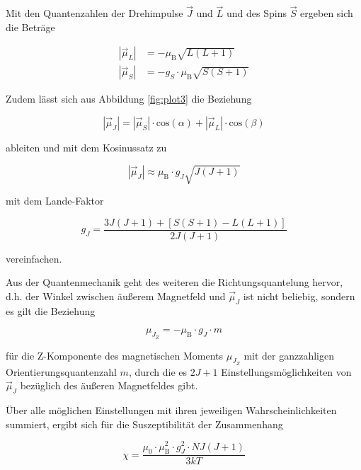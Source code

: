 Mit den Quantenzahlen der Drehimpulse $\vec{J}$ und $\vec{L}$ und des Spins $\vec{S}$
ergeben sich die Beträge

\begin{align}
    |\vec{\mu}_L| &= - \mu_\text{B} \sqrt{L\left(L+1\right)}\\
    |\vec{\mu}_S| &= - g_S \cdot \mu_\text{B} \sqrt{S\left(S+1\right)}
\end{align}

Zudem lässt sich aus Abbildung \ref{fig:plot3} die Beziehung

\begin{equation}
    |\vec{\mu}_J| = |\vec{\mu}_S| \cdot \text{cos}\left(\alpha \right) + 
    |\vec{\mu}_L| \cdot \text{cos}\left(\beta \right)
\end{equation}

ableiten und mit dem Kosinussatz zu 

\begin{equation}
    |\vec{\mu}_J| \approx \mu_\text{B} \cdot g_J \sqrt{J\left(J+1\right)}
\end{equation}

mit dem Lande-Faktor 

\begin{equation}
    g_J = \frac{3J(J+1) + [S(S+1) - L(L+1)]} {2 J(J+1)}
\end{equation}

vereinfachen.

Aus der Quantenmechanik geht des weiteren die Richtungsquantelung hervor, d.h.
der Winkel zwischen äußerem Magnetfeld und $\vec{\mu}_J$ ist nicht beliebig,
sondern es gilt die Beziehung 

\begin{equation}
    \mu_{J_Z} = - \mu_\text{B} \cdot g_J \cdot m
\end{equation}

für die Z-Komponente des magnetischen Moments $\mu_{J_Z}$ mit der ganzzahligen 
Orientierungsquantenzahl $m$, durch die es $2J+1$ Einstellungsmöglichkeiten
von $\vec{\mu}_J$ bezüglich des äußeren Magnetfeldes gibt. 

Über alle möglichen Einstellungen mit ihren jeweiligen Wahrscheinlichkeiten summiert,
ergibt sich für die Suszeptibilität der Zusammenhang

\begin{equation}
    \chi = \frac{\mu_0 \cdot \mu_\text{B}^2 \cdot g_J^2 \cdot N J (J+1)}{3kT}
    \label{eqn:theo}
\end{equation}

